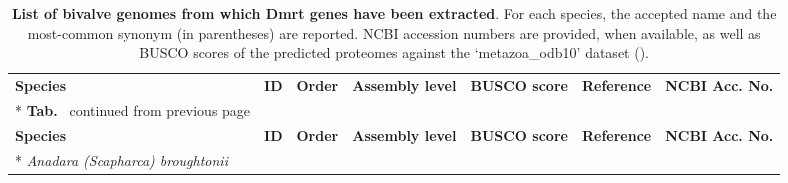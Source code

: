 \begin{landscape}
	\footnotesize
	\begin{longtable}[c]{@{}lllllll@{}}
		\caption[\textbf{List of bivalve genomes from which Dmrt genes have been extracted}]
		{
			\textbf{List of bivalve genomes from which Dmrt genes have been extracted}. For each species, the accepted name and the most-common synonym (in parentheses) are reported. NCBI accession numbers are provided, when available, as well as BUSCO scores of the predicted proteomes against the ‘metazoa\_odb10’ dataset ().
		}
		\label{tab:genomes}                                                                               \\
		\toprule
		\textbf{Species}                                                                                &
		\textbf{ID}                                                                                     &
		\textbf{Order}                                                                                  &
		\textbf{Assembly level}                                                                         &
		\textbf{BUSCO score}                                                                            &
		\textbf{Reference}                                                                              &
		\textbf{NCBI Acc. No.}                                                                            \\* \hline \hline
		\endfirsthead
		\multicolumn{7}{c}%
		{\textbf{Tab. \thetable}\ continued from previous page}                                       \\
		\toprule
		\textbf{Species}                                                                                &
		\textbf{ID}                                                                                     &
		\textbf{Order}                                                                                  &
		\textbf{Assembly level}                                                                         &
		\textbf{BUSCO score}                                                                            &
		\textbf{Reference}                                                                              &
		\textbf{NCBI Acc. No.}                                                                            \\* \hline \hline
		\endhead
		\endfoot
		\endlastfoot
		\textit{Anadara (Scapharca) broughtonii}                                                        &

\end{longtable}
\end{landscape}
